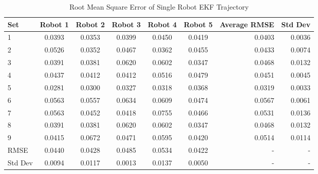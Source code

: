 \documentclass[12pt]{report}
\begin{document}
\begin{center}
\begin{table}[h]
  \caption{Root Mean Square Error of Single Robot EKF Trajectory}
  \begin{tabular}{| l | c | c | c | c | c || r ||r |}
    \hline
     Set & Robot 1 & Robot 2 & Robot 3 & Robot 4 & Robot 5 & Average RMSE & Std Dev \\ \hline \hline
     1 & 0.0393 & 0.0353 & 0.0399 & 0.0450 & 0.0419 & 0.0403 & 0.0036\\ \hline
     2 & 0.0526 & 0.0352 & 0.0467 & 0.0362 & 0.0455 & 0.0433 & 0.0074\\ \hline
     3 & 0.0391 & 0.0381 & 0.0620 & 0.0602 & 0.0347 & 0.0468 & 0.0132\\ \hline
     4 & 0.0437 & 0.0412 & 0.0412 & 0.0516 & 0.0479 & 0.0451 & 0.0045\\ \hline
     5 & 0.0281 & 0.0300 & 0.0327 & 0.0318 & 0.0368 & 0.0319 & 0.0033\\ \hline
     6 & 0.0563 & 0.0557 & 0.0634 & 0.0609 & 0.0474 & 0.0567 & 0.0061\\ \hline
     7 & 0.0563 & 0.0452 & 0.0418 & 0.0755 & 0.0466 & 0.0531 & 0.0136\\ \hline
     8 & 0.0391 & 0.0381 & 0.0620 & 0.0602 & 0.0347 & 0.0468 & 0.0132\\ \hline
     9 & 0.0415 & 0.0672 & 0.0471 & 0.0595 & 0.0420 & 0.0514 & 0.0114\\ \hline
    \hline
    RMSE & 0.0440 & 0.0428 & 0.0485 & 0.0534   & 0.0422 & - & -\\ \hline
    Std Dev & 0.0094 & 0.0117 & 0.0013 & 0.0137   & 0.0050 & - & -\\ \hline
    \hline
  \end{tabular}
  \end{table}
\end{center}
\end{document}
